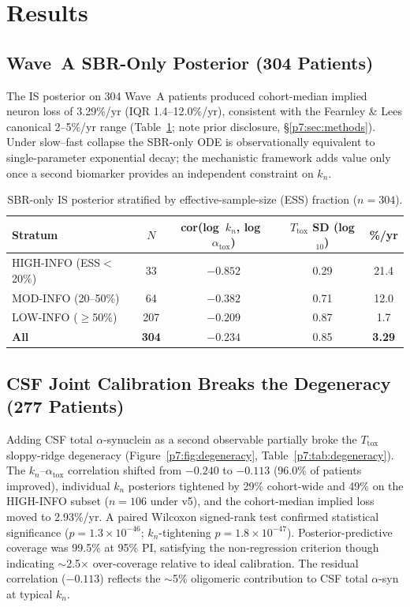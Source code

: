\section{Results}
\label{p7:sec:results}

\subsection*{Wave~A SBR-Only Posterior (304 Patients)}

The IS posterior on 304 Wave~A patients produced cohort-median implied neuron loss of 3.29\%/yr (IQR 1.4--12.0\%/yr), consistent with the Fearnley \& Lees canonical 2--5\%/yr range (Table~\ref{p7:tab:strata}; note prior disclosure, \S\ref{p7:sec:methods}). Under slow--fast collapse the SBR-only ODE is observationally equivalent to single-parameter exponential decay; the mechanistic framework adds value only once a second biomarker provides an independent constraint on $k_n$.

\begin{table}[H]
\centering
\small
\caption{SBR-only IS posterior stratified by effective-sample-size (ESS) fraction ($n{=}304$).}
\label{p7:tab:strata}
\begin{tabular}{lcccc}
\toprule
\textbf{Stratum} & $N$ & cor(log~$k_n$, log~$\alpha_\text{tox}$) & $T_\text{tox}$ SD (log$_{10}$) & \%/yr \\
\midrule
HIGH-INFO (ESS$<$20\%) & 33  & $-0.852$ & 0.29 & 21.4 \\
MOD-INFO (20--50\%)   & 64  & $-0.382$ & 0.71 & 12.0 \\
LOW-INFO ($\geq$50\%)  & 207 & $-0.209$ & 0.87 & 1.7  \\
\textbf{All}           & \textbf{304} & $-0.234$ & 0.85 & \textbf{3.29} \\
\bottomrule
\end{tabular}
\end{table}

\subsection*{CSF Joint Calibration Breaks the Degeneracy (277 Patients)}

Adding CSF total $\alpha$-synuclein as a second observable partially broke the $T_\text{tox}$ sloppy-ridge degeneracy (Figure~\ref{p7:fig:degeneracy}, Table~\ref{p7:tab:degeneracy}). The $k_n$--$\alpha_\text{tox}$ correlation shifted from $-0.240$ to $-0.113$ (96.0\% of patients improved), individual $k_n$ posteriors tightened by 29\% cohort-wide and 49\% on the HIGH-INFO subset ($n{=}106$ under v5), and the cohort-median implied loss moved to 2.93\%/yr. A paired Wilcoxon signed-rank test confirmed statistical significance ($p = 1.3{\times}10^{-46}$; $k_n$-tightening $p = 1.8{\times}10^{-47}$). Posterior-predictive coverage was 99.5\% at 95\% PI, satisfying the non-regression criterion though indicating $\sim$2.5$\times$ over-coverage relative to ideal calibration. The residual correlation ($-0.113$) reflects the $\sim$5\% oligomeric contribution to CSF total $\alpha$-syn at typical $k_n$.

